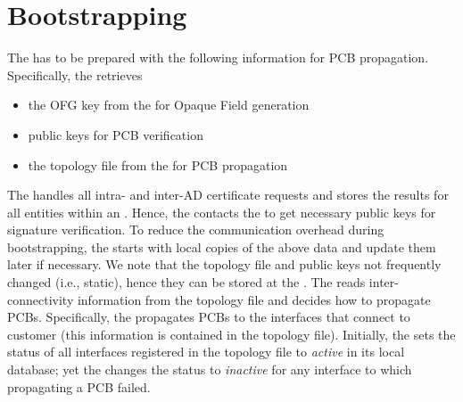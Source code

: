 \section{Bootstrapping}
The \BS has to be prepared with the following information for PCB propagation.
Specifically, the \BS retrieves 
\begin{itemize}
\item the OFG key from the \CS for Opaque Field generation 
\item \AD public keys for PCB verification
\item the topology file from the \CS for PCB propagation
\end{itemize}
The \CS handles all intra- and inter-AD certificate requests and stores the results for all entities within an \AD. Hence, the \BS contacts the \CS to get necessary \AD public keys for signature verification. To reduce the communication overhead during bootstrapping, the \BS starts with local copies of the above data and update them later if necessary. We note that the topology file and \AD public keys not frequently changed (i.e., static), hence they can be stored at the \BS. The \BS reads inter-\AD connectivity information from the topology file and decides how to propagate PCBs. Specifically, the \BS propagates PCBs to the interfaces that connect to customer \ADs (this information is contained in the topology file). Initially, the \BS sets the status of all interfaces registered in the topology file to {\em active} in its local database; yet the \BS changes the status to {\em inactive} for any interface to which propagating a PCB failed. 

